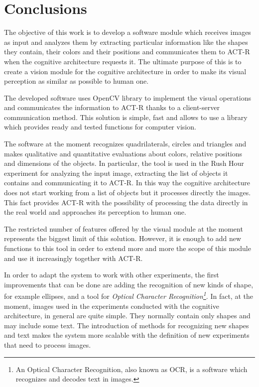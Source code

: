 \chapter{Conclusions}
	The objective of this work is to develop a software module which receives images as input and analyzes them by extracting particular information like the shapes they contain, their colors and their positions and communicates them to \mbox{ACT-R} when the cognitive architecture requests it. 
	The ultimate purpose of this is to create a vision module for the cognitive architecture in order to make its visual perception as similar as possible to human one.
	

	The developed software uses \mbox{OpenCV} library to implement the visual operations and communicates the information to \mbox{ACT-R} thanks to a client-server communication method. 
	This solution is simple, fast and allows to use a library which provides ready and tested functions for computer vision.  


	The software at the moment recognizes quadrilaterals, circles and triangles and makes qualitative and quantitative evaluations about colors, relative positions and dimensions of the objects. 
	In particular, the tool is used in the Rush Hour experiment for analyzing the input image, extracting the list of objects it contains and communicating it to \mbox{ACT-R}. 
	In this way the cognitive architecture does not start working from a list of objects but it processes directly the images.
	This fact provides \mbox{ACT-R} with the possibility of processing the data directly in the real world and approaches its perception to human one. 	
		

	The restricted number of features offered by the visual module at the moment represents the biggest limit of this solution.
	However, it is enough to add new functions to this tool in order to extend more and more the scope of this module and use it increasingly together with \mbox{ACT-R}.


	In order to adapt the system to work with other experiments, the first improvements that can be done are adding the recognition of new kinds of shape, for example ellipses, and a tool for \emph{{Optical Character Recognition\footnote{An Optical Character Recognition, also known as OCR, is a software which recognizes and decodes text in images.}}}.
	In fact, at the moment, images used in the experiments conducted with the cognitive architecture, in general are quite simple.
	They normally contain only shapes and may include some text.
	The introduction of methods for recognizing new shapes and text makes the system more scalable with the definition  of new experiments that need to process images.


